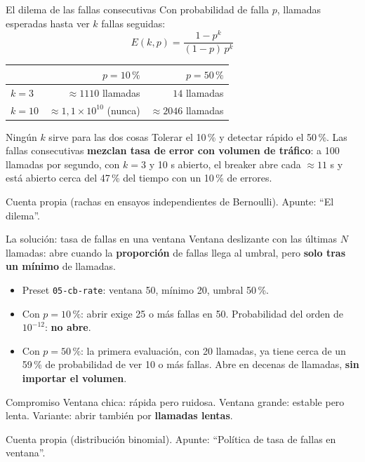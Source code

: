 \documentclass[institutional,screen,none]{ua-engineering-v6-beamer}
\begin{document}
\begin{frame}{El dilema de las fallas consecutivas}
Con probabilidad de falla $p$, llamadas esperadas hasta ver $k$ fallas seguidas:
\[
E(k,p) = \frac{1 - p^{k}}{(1-p)\,p^{k}}
\]

\begin{center}
\begin{tabular}{lrr}
\toprule
 & $p = 10\,\%$ & $p = 50\,\%$ \\
\midrule
$k = 3$  & $\approx 1110$ llamadas & $14$ llamadas \\
$k = 10$ & $\approx 1{,}1 \times 10^{10}$ (nunca) & $\approx 2046$ llamadas \\
\bottomrule
\end{tabular}
\end{center}

\begin{alertblock}{Ningún $k$ sirve para las dos cosas}
Tolerar el 10\,\% y detectar rápido el 50\,\%. Las fallas consecutivas \textbf{mezclan tasa de error con volumen de tráfico}: a 100 llamadas por segundo, con $k = 3$ y 10 s abierto, el breaker abre cada $\approx 11$ s y está abierto cerca del 47\,\% del tiempo con un 10\,\% de errores.
\end{alertblock}

{\scriptsize\color{UAIngMuted}Cuenta propia (rachas en ensayos independientes de Bernoulli). Apunte: ``El dilema''.}
\end{frame}

\begin{frame}{La solución: tasa de fallas en una ventana}
Ventana deslizante con las últimas $N$ llamadas: abre cuando la \textbf{proporción} de fallas llega al umbral, pero \textbf{solo tras un mínimo} de llamadas.

\begin{itemize}
\item Preset \texttt{05-cb-rate}: ventana 50, mínimo 20, umbral 50\,\%.
\item Con $p = 10\,\%$: abrir exige 25 o más fallas en 50. Probabilidad del orden de $10^{-12}$: \textbf{no abre}.
\item Con $p = 50\,\%$: la primera evaluación, con 20 llamadas, ya tiene cerca de un 59\,\% de probabilidad de ver 10 o más fallas. Abre en decenas de llamadas, \textbf{sin importar el volumen}.
\end{itemize}

\begin{block}{Compromiso}
Ventana chica: rápida pero ruidosa. Ventana grande: estable pero lenta. Variante: abrir también por \textbf{llamadas lentas}.
\end{block}

{\scriptsize\color{UAIngMuted}Cuenta propia (distribución binomial). Apunte: ``Política de tasa de fallas en ventana''.}
\end{frame}
\end{document}
